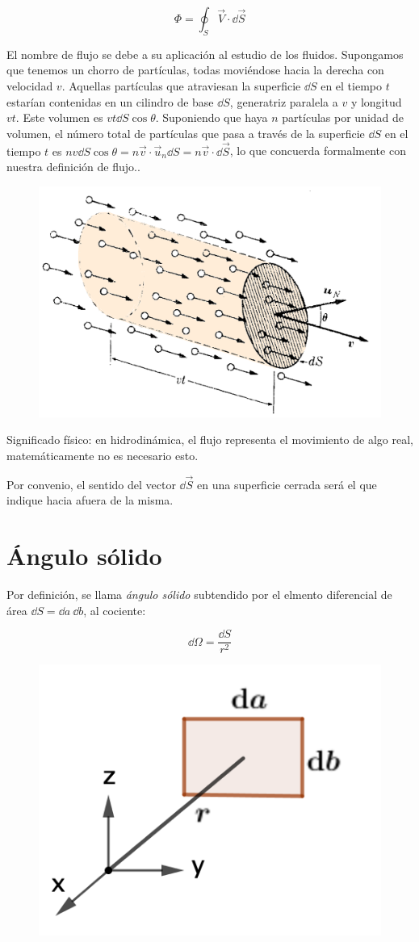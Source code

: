 \begin{equation}
	\Phi= \oint_S \vec V \cdot \dd \vec S 
\end{equation}


\begin{multicols}{2}
\small{El nombre de flujo se debe a su aplicación al estudio de los fluidos. Supongamos que tenemos un chorro de partículas, todas moviéndose hacia la derecha con velocidad $v$. Aquellas partículas que atraviesan la superficie $\dd S$ en el tiempo $t$ estarían contenidas en un cilindro de base $\dd S$, generatriz paralela a $v$ y longitud $vt$. Este volumen es $vt \dd S \cos \theta$. Suponiendo que haya $n$ partículas por unidad de volumen, el número total de partículas que pasa a través de la superficie $\dd S$ en el tiempo $t$ es $nv \dd S \cos \theta=n\vec v \cdot \vec u_n \dd S=n\vec v\cdot \dd \vec S$}, lo que concuerda formalmente con nuestra definición de flujo.\normalsize{.}
\begin{figure}[H]
	\centering
	\includegraphics[width=.55\textwidth]{imagenes/imagenes23/T23IM02.png}
\end{figure}	
\end{multicols}

Significado físico: en hidrodinámica, el flujo representa el movimiento de algo real, matemáticamente no es necesario esto.

Por convenio, el sentido del vector $\dd \vec S$ en una superficie cerrada será el que indique hacia afuera de la misma.

\section{Ángulo sólido}

\begin{multicols}{2}
Por definición, se llama \emph{ángulo sólido} subtendido por el elmento diferencial de área $\dd S=\dd a \ \dd b$, al cociente:

\begin{equation}
\boldsymbol \dd \Omega	= \dfrac {\dd S}{r^2}
\end{equation}

\begin{figure}[H]
	\centering
	\includegraphics[width=.3\textwidth]{imagenes/imagenes23/T23IM03.png}
\end{figure}
\end{multicols}

